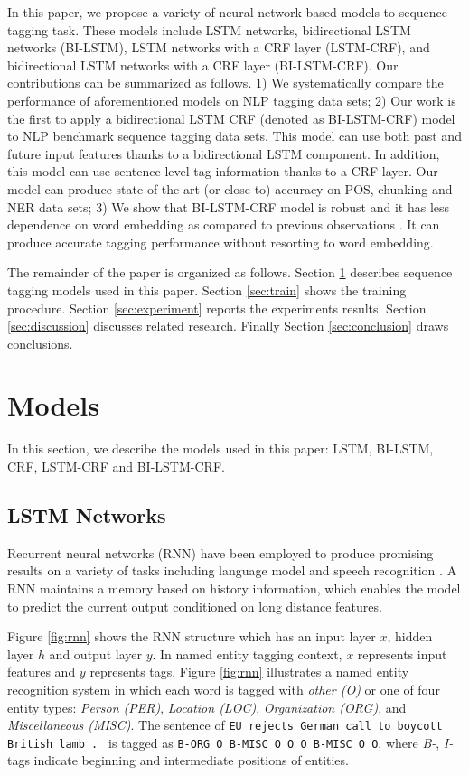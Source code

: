 \documentclass[11pt,a4paper]{article}
\begin{document}
In this paper, we propose a variety of neural network based models to sequence tagging task. These models include LSTM networks, bidirectional LSTM networks (BI-LSTM), LSTM networks with a CRF layer (LSTM-CRF), and bidirectional LSTM networks with a CRF layer (BI-LSTM-CRF). Our contributions can be summarized as follows. 1) We systematically compare the performance of aforementioned models on NLP tagging data sets; 2) Our work is the first to apply a bidirectional LSTM CRF (denoted as BI-LSTM-CRF) model to NLP benchmark sequence tagging data sets. This model can use both past and future input features thanks to a bidirectional LSTM component. In addition, this model can use sentence level tag information thanks to a CRF layer. Our model can produce state of the art (or close to) accuracy on POS, chunking and NER data sets; 3) We show that BI-LSTM-CRF model is robust and it has less dependence on word embedding as compared to previous observations \cite{collobert1}. It can produce accurate tagging performance without resorting to word embedding. 

The remainder of the paper is organized as follows. Section \ref{sec:model} describes sequence tagging models used in this paper. Section \ref{sec:train} shows the training procedure. Section \ref{sec:experiment} reports the experiments results. Section \ref{sec:discussion} discusses related research. Finally Section \ref{sec:conclusion} draws conclusions.


\section{Models} \label{sec:model}
In this section, we describe the models used in this paper: LSTM, BI-LSTM, CRF, LSTM-CRF and BI-LSTM-CRF.  

\subsection{LSTM Networks}
Recurrent neural networks (RNN) have been employed to produce promising results on a variety of tasks including language model \cite{mikolov1,mikolov2} and speech recognition \cite{graves1}.  A RNN maintains a memory based on history information, which enables the model to predict the current output conditioned on long distance features. 

Figure \ref{fig:rnn} shows the RNN structure \cite{elman1} which has an input layer $x$, hidden layer $h$ and output layer $y$. In named entity tagging context, $x$ represents input features and $y$ represents tags. Figure \ref{fig:rnn} illustrates a named entity recognition system in which each word is tagged with \textit{other (O)} or one of four entity types: \textit{Person (PER)}, \textit{Location (LOC)}, \textit{Organization (ORG)}, and \textit{Miscellaneous (MISC)}.  The sentence of \texttt{EU rejects German call to boycott British lamb . } is tagged as \texttt{B-ORG O B-MISC O O O B-MISC O O}, where \textit{B-}, \textit{I-} tags indicate beginning and intermediate positions of entities. 
\end{document}

